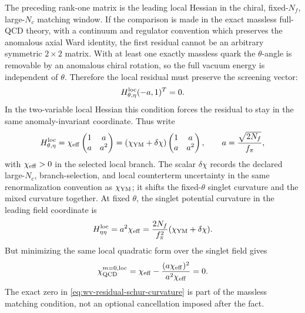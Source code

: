 \begin{controlledapproximation}
\label{ca:residual-controlled-witten-veneziano}
The preceding rank-one matrix is the leading local Hessian in the chiral,
fixed-\(N_f\), large-\(N_c\) matching window.  If the comparison is made in
the exact massless full-QCD theory, with a continuum and regulator convention
which preserves the anomalous axial Ward identity, the first residual cannot
be an arbitrary symmetric \(2\times2\) matrix.  With at least one exactly
massless quark the \(\theta\)-angle is removable by an anomalous chiral
rotation, so the full vacuum energy is independent of \(\theta\).  Therefore
the local residual must preserve the screening vector:
\[
  H_{\theta,\eta}^{\rm loc}(-a,1)^T=0 .
\]
In the two-variable local Hessian this condition forces the residual to stay
in the same anomaly-invariant coordinate.  Thus write
\begin{equation}
  H_{\theta,\eta}^{\rm loc}
  =
    \chi_{\rm eff}
    \begin{pmatrix}1&a\\ a&a^2\end{pmatrix}
  =
    (\chi_{\rm YM}+\delta\chi)
    \begin{pmatrix}1&a\\ a&a^2\end{pmatrix},
  \qquad
  a=\frac{\sqrt{2N_f}}{f_\pi},
  \label{eq:wv-residual-local-hessian}
\end{equation}
with \(\chi_{\rm eff}>0\) in the selected local branch.  The scalar
\(\delta\chi\) records the declared large-\(N_c\), branch-selection, and local
counterterm uncertainty in the same renormalization convention as
\(\chi_{\rm YM}\); it shifts the fixed-\(\theta\) singlet curvature and the
mixed curvature together.  At fixed \(\theta\), the singlet potential
curvature in the leading field coordinate is
\begin{equation}
  H_{\eta\eta}^{\rm loc}
  =
  a^2\chi_{\rm eff}
  =
  \frac{2N_f}{f_\pi^2}(\chi_{\rm YM}+\delta\chi).
  \label{eq:wv-residual-singlet-curvature}
\end{equation}
But minimizing the same local quadratic form over the singlet field gives
\begin{equation}
  \chi_{\rm QCD}^{m=0,{\rm loc}}
  =
  \chi_{\rm eff}
  -
  \frac{(a\chi_{\rm eff})^2}{a^2\chi_{\rm eff}}
  =
  0 .
  \label{eq:wv-residual-schur-curvature}
\end{equation}
The exact zero in \eqref{eq:wv-residual-schur-curvature} is part of the
massless matching condition, not an optional cancellation imposed after the
fact.


\end{controlledapproximation}
